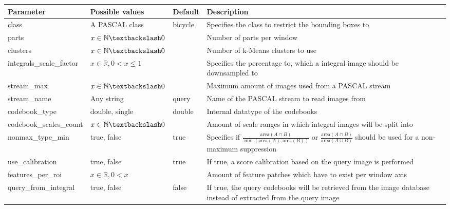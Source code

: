 \begin{longtable}{%
|%
p{}%
|%
>{\raggedright\arraybackslash}%
p{}%
|%
>{\raggedright\arraybackslash}%
p{}%
|%
>{\raggedright\arraybackslash}%
p{}%
|%
}
\hline \textbf{Parameter} & \textbf{Possible values} & \textbf{Default} & \textbf{Description} \\ 
\hline
\hline class & A PASCAL class & bicycle & Specifies the class to restrict the bounding boxes to \\ 
\hline parts & $x \in \mathbb{N} \textbackslash 0$ & 4 & Number of parts per window \\ 
\hline clusters & $x \in \mathbb{N} \textbackslash 0$ & 1000 & Number of k-Means clusters to use \\ 
\hline integrals\allowbreak\_scale\allowbreak\_factor & $x \in \mathbb{R}, 0 < x \le 1$ & 1 & Specifies the percentage to, which a integral image should be downsampled to \\ 
\hline stream\allowbreak\_max & $x \in \mathbb{N} \textbackslash 0$ & 100 & Maximum amount of images used from a PASCAL stream \\ 
\hline stream\allowbreak\_name & Any string & query & Name of the PASCAL stream to read images from \\ 
\hline codebook\allowbreak\_type & double, single & double & Internal datatype of the codebooks \\ 
\hline codebook\allowbreak\_scales\allowbreak\_count & $x \in \mathbb{N} \textbackslash 0$ & 3 & Amount of scale ranges in which integral images will be split into \\ 
\hline nonmax\allowbreak\_type\allowbreak\_min & true, false & true & Specifies if $\frac{\text{area}(A \cap B)}{\min(\text{area}(A), \text{area}(B))}$ or $\frac{\text{area}(A \cap B)}{\text{area}(A \cup B)}$ should be used for a non-maximum suppression \\ 
\hline use\allowbreak\_calibration & true, false & true & If true, a score calibration based on the query image is performed \\ 
\hline features\allowbreak\_per\allowbreak\_roi & $x \in \mathbb{R}, 0 < x$ & 2 & Amount of feature patches which have to exist per window axis \\ 
\hline query\allowbreak\_from\allowbreak\_integral & true, false & false & If true, the query codebooks will be retrieved from the image database instead of extracted from the query image \\ 

\end{longtable}

